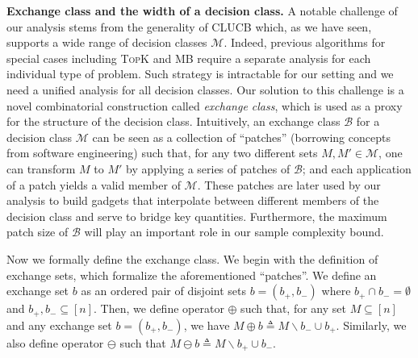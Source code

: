 \documentclass{article}
\newcommand{\Algorithm}{{\small \textsf{CLUCB}}\xspace}
\newcommand{\M}{\mathcal M}
\newcommand{\B}{\mathcal B}
\newcommand{\del}{\backslash}
\newcommand{\MultiIdent}{\textsc{TopK}\xspace}
\newcommand{\MultiBandit}{\textsc{MB}\xspace}
\begin{document}
\textbf{Exchange class and the width of a decision class.} 
A notable challenge of our analysis stems from the generality of \Algorithm which, as we have seen, supports a wide range of decision classes $\M$.
Indeed, previous algorithms for special cases including \MultiIdent and \MultiBandit require a separate analysis for each individual type of problem.
Such strategy is intractable for our setting and we need a unified analysis for all decision classes.
Our solution to this challenge is a novel combinatorial construction called \emph{exchange class}, which is used as a proxy for the structure of the decision class.
Intuitively, an exchange class $\B$ for a decision class $\M$ can be seen as a collection of ``patches'' (borrowing concepts from software engineering) such that, for any two different sets $M,M'\in \M$, one can transform $M$ to $M'$ by applying a series of patches of $\B$; and each application of a patch yields a valid member of $\M$.
These patches are later used by our analysis to build gadgets that interpolate between different members of the decision class and serve to bridge key quantities.
Furthermore, the maximum patch size of $\B$ will play an important role in our sample complexity bound.


Now we formally define the exchange class.
We begin with the definition of exchange sets, which formalize the aforementioned ``patches''.
We define an exchange set $b$ as an ordered pair of disjoint sets $b=(b_+,b_-)$ where $b_+\cap b_- = \emptyset$ and $b_+,b_-\subseteq [n]$.
Then, we define operator $\oplus$ such that, for any set $M \subseteq [n]$ and any exchange set $b=(b_+,b_-)$, we have $M\oplus b \triangleq M\del b_- \cup b_+$.
Similarly, we also define operator $\ominus$ such that $M\ominus b \triangleq M\del b_+\cup b_-$.
\end{document}
